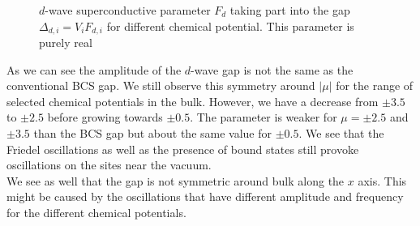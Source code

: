 \documentclass[..\main.tex]{subfile}
\begin{document}
\begin{figure}[H]
    
    \caption{$d$-wave superconductive parameter $F_d$ taking part into the gap $\Delta_{d,i} = V_i F_{d,i}$ for different chemical potential. This parameter is purely 
    real}
\end{figure}
As we can see the amplitude of the $d$-wave gap is not the same as the conventional BCS gap. We still observe this symmetry around $|\mu|$ for the range of selected chemical potentials in the bulk.
However, we have a decrease from $\pm3.5$ to $\pm2.5$ before growing towards $\pm0.5$. The parameter is weaker for $\mu=\pm2.5$ and $\pm3.5$ than the BCS gap but
about the same value for $\pm0.5$. We see that the Friedel oscillations as well as the presence of bound states still provoke oscillations on the sites near the vacuum.\\
We see as well that the gap is not symmetric around bulk along the $x$ axis. This might be caused by the oscillations that have different amplitude and frequency
for the different chemical potentials.\\



\end{document}
